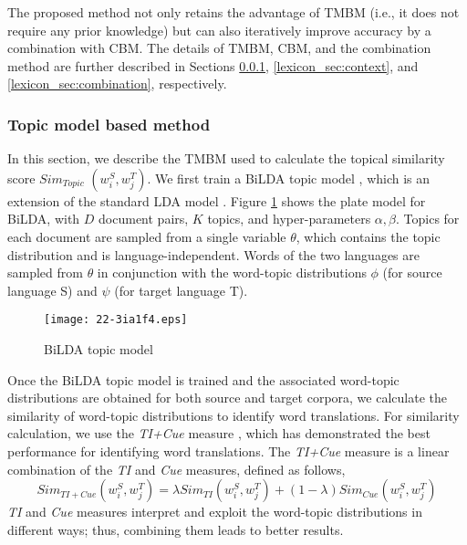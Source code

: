 \documentclass[english]{jnlp_1.4}
\begin{document}
The proposed method not only retains the advantage of TMBM (i.e., it does not require 
any prior knowledge) but can also iteratively improve accuracy by a combination with CBM. 
The details of TMBM, CBM, and the combination method are further described in Sections
\ref{lexicon_sec:bilda}, \ref{lexicon_sec:context}, and \ref{lexicon_sec:combination}, respectively.


\subsubsection{Topic model based method}
\label{lexicon_sec:bilda}

In this section, we describe the TMBM used to calculate the topical similarity score $Sim_{Topic}$
$(w_i^S,w_j^T)$.
We first train a BiLDA topic model \cite{mimno-EtAl:2009:EMNLP},
which is an extension of the standard LDA model
\cite{Blei03latentdirichlet}. Figure \ref{lexicon_fig:bilda} shows the plate
model for BiLDA, with $D$ document pairs, $K$ topics, and hyper-parameters
$\alpha, \beta$. Topics for each document are sampled from a single
variable $\theta$, which contains the topic distribution and is
language-independent. Words of the two languages are sampled from
$\theta$ in conjunction with the word-topic distributions $\phi$ (for
source language S) and $\psi$ (for target language T).

\begin{figure}[t]
\begin{center}
\texttt{[image: 22-3ia1f4.eps]}
\end{center}
\caption{BiLDA topic model}
\label{lexicon_fig:bilda}
\vspace{-1\Cvs}
\end{figure}

Once the BiLDA topic model is trained and the associated word-topic
distributions are obtained for both source and target corpora, we
calculate the similarity of word-topic distributions to
identify word translations. For similarity calculation, we use the
{\it TI+Cue} measure \cite{vulic-desmet-moens:2011:ACL-HLT2011},
which has demonstrated the best performance for identifying word translations.
The {\it TI+Cue} measure is a linear combination of the {\it TI}
and {\it Cue} measures, defined as follows,
\begin{equation}
\mathit{Sim}_\mathit{TI+Cue}(w_i^S, w_j^T)=\lambda\mathit{Sim}_\mathit{TI}(w_i^S,
w_j^T)+(1-\lambda) \mathit{Sim}_\mathit{Cue}(w_i^S, w_j^T)
\end{equation}
{\it TI} and {\it Cue} measures interpret and exploit the word-topic
distributions in different ways; thus, combining them leads to
better results.
\end{document}
